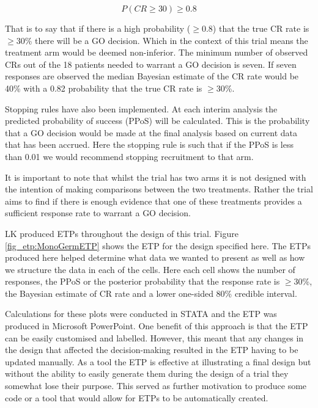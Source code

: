 \begin{equation}
	P(CR \geq 30) \geq 0.8
\end{equation}

That is to say that if there is a high probability ($\geq 0.8$) that the true CR rate is $\geq30$\% there will be a GO decision. Which in the context of this trial means the treatment arm would be deemed non-inferior. The minimum number of observed CRs out of the 18 patients needed to warrant a GO decision is seven. If seven responses are observed the median Bayesian estimate of the CR rate would be 40\% with a 0.82 probability that the true CR rate is $\geq30$\%. 

Stopping rules have also been implemented. At each interim analysis the predicted probability of success (PPoS) will be calculated. This is the probability that a GO decision would be made at the final analysis based on current data that has been accrued. Here the stopping rule is such that if the PPoS is less than 0.01 we would recommend stopping recruitment to that arm. 

It is important to note that whilst the trial has two arms it is not designed with the intention of making comparisons between the two treatments. Rather the trial aims to find if there is enough evidence that one of these treatments provides a sufficient response rate to warrant a GO decision.  

LK produced ETPs throughout the design of this trial. Figure \ref{fig_etp:MonoGermETP} shows the ETP for the design specified here. The ETPs produced here helped determine what data we wanted to present as well as how we structure the data in each of the cells. Here each cell shows the number of responses, the PPoS or the posterior probability that the response rate is $\geq30$\%, the Bayesian estimate of CR rate and a lower one-sided 80\% credible interval.

Calculations for these plots were conducted in STATA and the ETP was produced in Microsoft PowerPoint. One benefit of this approach is that the ETP can be easily customised and labelled. However, this meant that any changes in the design that affected the decision-making resulted in the ETP having to be updated manually. As a tool the ETP is effective at illustrating a final design but without the ability to easily generate them during the design of a trial they somewhat lose their purpose. This served as further motivation to produce some code or a tool that would allow for ETPs to be automatically created. 

